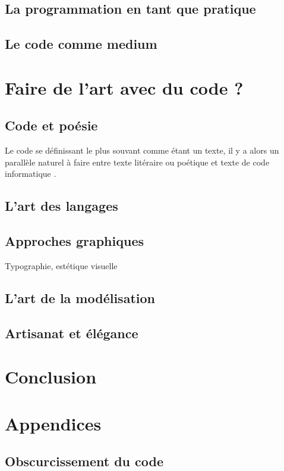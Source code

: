 \documentclass[12pt]{article} %
\begin{document}
\subsection{La programmation en tant que pratique}
\subsection{Le code comme medium}

\section{Faire de l'art avec du code ?}

\subsection{Code et poésie}
Le code se définissant le plus souvant comme étant un texte, il y a alors un parallèle naturel à faire entre texte litéraire ou poétique et texte de code informatique \cite{FCramer2001}.

\subsection{L'art des langages}
\subsection{Approches graphiques}
Typographie, estétique visuelle

\subsection{L'art de la modélisation}
\subsection{Artisanat et élégance}




\section{Conclusion}

\newpage
\section{Appendices}

\subsection{Obscurcissement du code}



\printglossary[type=\acronymtype]
\printglossary


\newpage



\restoregeometry
\end{document}

